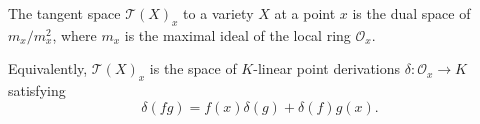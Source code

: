 The tangent space $\mathcal{T}(X)_x$ to a variety $X$ at a point $x$ is the dual space of $m_x/m_x^2$, where $m_x$ is the maximal ideal of the local ring $\mathcal{O}_x$.

Equivalently, $\mathcal{T}(X)_x$ is the space of $K$-linear point derivations $\delta: \mathcal{O}_x \rightarrow K$ satisfying
$$\delta(fg) = f(x)\delta(g) + \delta(f)g(x).$$
